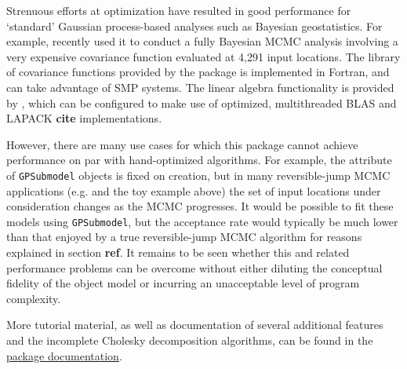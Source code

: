\documentclass[article]{jss}
\begin{document}
Strenuous efforts at optimization have resulted in good performance for `standard' Gaussian process-based analyses such as Bayesian geostatistics. For example, \cite{map} recently used it to conduct a fully Bayesian MCMC analysis involving a very expensive covariance function evaluated at 4,291 input locations. The library of covariance functions provided by the package is implemented in Fortran, and can take advantage of SMP systems. The linear algebra functionality is provided by , which can be configured to make use of optimized, multithreaded BLAS and LAPACK \textbf{cite} implementations. 

However, there are many use cases for which this package cannot achieve performance on par with hand-optimized algorithms. For example, the  attribute of \texttt{GPSubmodel} objects is fixed on creation, but in many reversible-jump MCMC applications (e.g. \cite{gramacy} and the toy example above) the set of input locations under consideration changes as the MCMC progresses. It would be possible to fit these models using \texttt{GPSubmodel}, but the acceptance rate would typically be much lower than that enjoyed by a true reversible-jump MCMC algorithm for reasons explained in section \textbf{ref}. It remains to be seen whether this and related performance problems can be overcome without either diluting the conceptual fidelity of the object model or incurring an unacceptable level of program complexity.

More tutorial material, as well as documentation of several additional features and the incomplete Cholesky decomposition algorithms, can be found in the \href{http://pymc.googlecode.com/files/GPUserGuide.pdf}{package documentation}.


\end{document}
